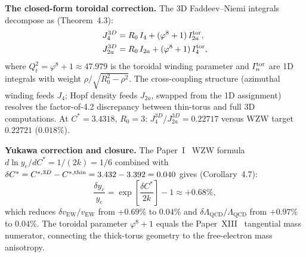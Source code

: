 \documentclass[11pt,a4paper]{article}
\newcommand{\vp}{\varphi}
\newcommand{\vEW}{v_{\mathrm{EW}}}
\begin{document}
\textbf{The closed-form toroidal correction.}
The 3D Faddeev--Niemi integrals decompose as
(Theorem~4.3):
\begin{align}
  J_4^{3D} &= R_0\,I_4 + (\vp^8+1)\,I_{2a}^{\rm tor}, \\
  J_{2a}^{3D} &= R_0\,I_{2a} + (\vp^8+1)\,I_4^{\rm tor},
\end{align}
where $Q_t^2 = \vp^8+1 \approx 47.979$ is the toroidal winding parameter
and $I_n^{\rm tor}$ are 1D integrals with weight
$\rho/\sqrt{R_0^2-\rho^2}$. The cross-coupling structure (azimuthal
winding feeds $J_4$; Hopf density feeds $J_{2a}$, swapped from the
1D assignment) resolves the factor-of-4.2 discrepancy between thin-torus
and full 3D computations. At $C^*=3.4318$, $R_0=3$:
$J_4^{3D}/J_{2a}^{3D} = 0.22717$ versus WZW target $0.22721$ ($0.018\%$).

\textbf{Yukawa correction and closure.}
The Paper~I~\cite{Paper1} WZW formula $d\ln y_e/dC^* = 1/(2k) = 1/6$ combined with
$\delta C^* = C^{*,3D} - C^{*,{\rm thin}} = 3.432 - 3.392 = 0.040$
gives (Corollary~4.7):
\begin{equation}
  \frac{\delta y_e}{y_e} = \exp\!\left[\frac{\delta C^*}{2k}\right] - 1
  \approx +0.68\%,
\end{equation}
which reduces $\delta\vEW/\vEW$ from $+0.69\%$ to $0.04\%$ and
$\delta\Lambda_{\mathrm{QCD}}/\Lambda_{\mathrm{QCD}}$ from $+0.97\%$
to $0.04\%$. The toroidal parameter $\vp^8+1$ equals the Paper~XIII~\cite{Paper13}
tangential mass numerator, connecting the thick-torus geometry to the
free-electron mass anisotropy.
\end{document}
